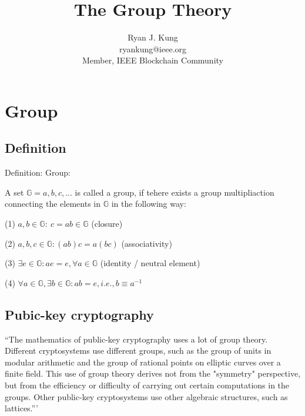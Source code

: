 \documentclass[twocolumn]{article}
\author{Ryan J. Kung \\ryankung@ieee.org\\Member, IEEE Blockchain Community }
\title{The Group Theory}
\begin{document}
\maketitle
\section{Group}
\subsection{Definition}
Definition: Group\cite{Cardelli:1996:TS:234313.234418}:

A set $\mathbb{G}={a, b, c, ...}$ is called a group, if tehere exists a group multipliaction connecting the elements in $\mathbb{G}$ in the following way:

(1) $a, b \in \mathbb{G}:\ c=a b \in \mathbb{G}$ (closure)

(2) $a, b, c \in \mathbb{G}: (ab)c=a(bc)$ (associativity)

(3) $\exists e \in \mathbb{G}: ae=e, \forall a \in \mathbb{G}$ (identity / neutral element)

(4) $\forall a \in \mathbb{G}, \exists b \in \mathbb{G}: ab=e, i.e., b\equiv a^{-1}$

\subsection{Pubic-key cryptography}
``The mathematics of public-key cryptography uses a lot of group theory. Different cryptosystems use different groups, such as the group of units in modular arithmetic and the group of rational points on elliptic curves over a finite field. This use of group theory derives not from the "symmetry" perspective, but from the efficiency or difficulty of carrying out certain computations in the groups. Other public-key cryptosystems use other algebraic structures, such as lattices.''' \cite{Cardelli:1996:TS:234313.234418}


\end{document}
